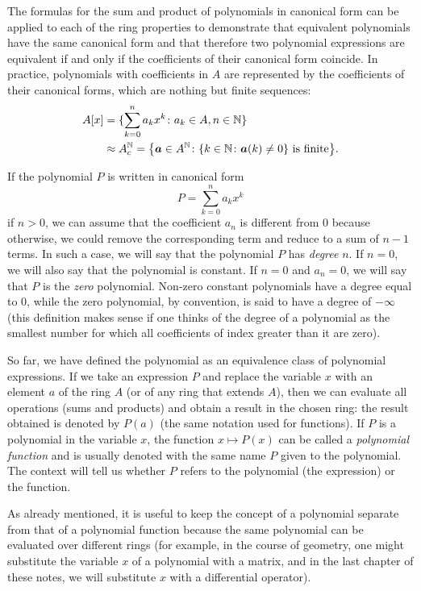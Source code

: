 The formulas for the sum and product of polynomials in canonical form 
can be applied to each of the ring properties to demonstrate
that equivalent polynomials have the same canonical form and that therefore 
two polynomial expressions are equivalent if and only if the coefficients 
of their canonical form coincide.
In practice, polynomials with coefficients in $A$ are 
represented by the coefficients of their canonical forms, which 
are nothing but finite sequences:
\begin{align*}
  A[x] 
  &= \{\sum_{k=0}^n a_k x^k\colon a_k\in A, n\in {\mathbb N}\}\\
  &\approx A^{\mathbb N}_c 
    = {\left\{ \boldsymbol a \in A^{\mathbb N}\colon {\left\{ k\in {\mathbb N}\colon \boldsymbol a(k)\neq 0 \right\}}
  \text{ is finite} \right\}}.
\end{align*}

If the polynomial $P$ is written in canonical form
\[
  P = \sum_{k=0}^n a_k x^k
\]
if $n>0$, we can assume that the coefficient $a_n$ is different from $0$ 
because otherwise, we could remove the corresponding term and reduce 
to a sum of $n-1$ terms. 
In such a case, we will say that the polynomial $P$ has \emph{degree}%
%
 $n$.
%
% 
If $n=0$, we will also say that the polynomial is constant.
If $n=0$ and $a_n=0$, we will say that $P$ is the \emph{zero} polynomial.
Non-zero constant polynomials have a degree equal to $0$, while the zero
polynomial,
by convention, is said to have a degree of $-\infty$ (this definition makes
sense if one thinks
of the degree of a polynomial as the smallest number for which all coefficients
of
index greater than it are zero).

So far, we have defined the polynomial as an equivalence class of 
polynomial expressions. 
If we take an expression $P$ and replace the variable $x$ 
with an element $a$ of the ring $A$ (or of any ring that extends 
$A$), then we can evaluate all operations (sums and products) and 
obtain a result in the chosen ring: the result 
obtained is denoted by $P(a)$ (the same notation used for functions).
If $P$ is a polynomial in the variable $x$, the function $x\mapsto P(x)$ 
can be called a \emph{polynomial function}%
%
 and is usually denoted 
with the same name $P$ given to the polynomial. The context will tell us 
whether $P$ refers to the polynomial (the expression) or the function.

As already mentioned, it is useful to keep the concept of a polynomial separate
from that of a
polynomial function because the same polynomial can be evaluated over different 
rings (for example, in the course of geometry, one might substitute
the variable $x$ of a polynomial with a matrix, 
and in the last chapter of these notes, 
we will substitute $x$ with a differential operator).

